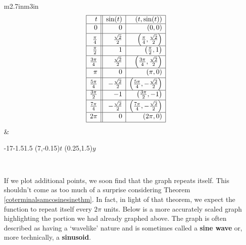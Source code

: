 \documentclass{ximera}
\begin{document}
\hspace{.5in} \begin{tabular}{m{2.7in}m{3in}}
\setlength{\extrarowheight}{2pt}
\[ \begin{array}{|r||r|r|}  

\hline

 t & \sin(t) & (t,\sin(t)) \\ \hline
0  & 0 & (0, 0) \\ [2pt]   \hline
\frac{\pi}{4}  & \frac{\sqrt{2}}{2} & \left(\frac{\pi}{4}, \frac{\sqrt{2}}{2}\right) \\ [2pt] \hline 
\frac{\pi}{2}  & 1 & \left(\frac{\pi}{2}, 1\right) \\ [2pt] \hline 
\frac{3\pi}{4}  & \frac{\sqrt{2}}{2} & \left(\frac{3\pi}{4}, \frac{\sqrt{2}}{2}\right) \\ [2pt] \hline 
\pi & 0 & (\pi, 0) \\ [2pt] \hline 
\frac{5\pi}{4}  & -\frac{\sqrt{2}}{2} & \left(\frac{5\pi}{4}, -\frac{\sqrt{2}}{2}\right) \\ [2pt] \hline 
\frac{3\pi}{2}  & -1 & \left(\frac{3\pi}{2}, -1 \right) \\ [2pt] \hline 
\frac{7\pi}{4}  & -\frac{\sqrt{2}}{2} & \left(\frac{7\pi}{4}, -\frac{\sqrt{2}}{2}\right) \\ [2pt] \hline 
2\pi  & 0 & (2\pi, 0) \\  [2pt] \hline
\end{array} \] \setlength{\extrarowheight}{0pt} &

\begin{mfpic}[25][50]{-1}{7}{-1.5}{1.5}
\axes
\tlabel[cc](7,-0.15){\scriptsize $t$}
\tlabel[cc](0.25,1.5){\scriptsize $y$}
\tlpointsep{4pt}
\scriptsize
{}
\normalsize
{}
\penwd{1.1pt}
\end{mfpic} \\

\end{tabular}

If we plot additional points, we soon find that the graph repeats itself.   This shouldn't come as too much of a surprise considering Theorem \ref{coterminalsamcosinesinethm}.  In fact, in light of that theorem, we expect the function to repeat itself every $2\pi$ units.  Below is a more accurately scaled graph highlighting the portion we had already graphed above.  The graph is often described as having a `wavelike' nature and is sometimes called a  \textbf{sine wave} or, more technically, a \textbf{sinusoid}.
\end{document}
